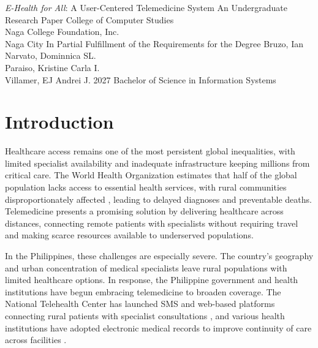 \documentclass{research}
\begin{document}
\maketitlepage
  {\textit{E-Health for All}: A User-Centered Telemedicine System}
  {An Undergraduate Research Paper}
  {College of Computer Studies \\ Naga College Foundation, Inc. \\ Naga City}
  {In Partial Fulfillment of the Requirements for the Degree}
  {Bruzo, Ian \\[4pt]
   Narvato, Dominnica SL. \\[4pt]
   Paraiso, Kristine Carla I. \\[4pt]
   Villamer, EJ Andrei J.}
  {2027}
  {Bachelor of Science in Information Systems}

\setcounter{page}{1}
\section{Introduction}

Healthcare access remains one of the most persistent global inequalities, with limited specialist
availability and inadequate infrastructure keeping millions from critical care. The World Health
Organization estimates that half of the global population lacks access to essential health services,
with rural communities disproportionately affected \cite{WHO2023}, leading to delayed diagnoses and
preventable deaths. Telemedicine presents a promising solution by delivering healthcare across
distances, connecting remote patients with specialists without requiring travel and making scarce
resources available to underserved populations.

In the Philippines, these challenges are especially severe. The country's geography and urban
concentration of medical specialists leave rural populations with limited healthcare options. In
response, the Philippine government and health institutions have begun embracing telemedicine to
broaden coverage. The National Telehealth Center has launched SMS and web-based platforms
connecting rural patients with specialist consultations \cite{Macariola2021,Pickering2024}, and
various health institutions have adopted electronic medical records to improve continuity of care
across facilities \cite{Santos2021,PhilPrimaryStudies2024}.
\end{document}
